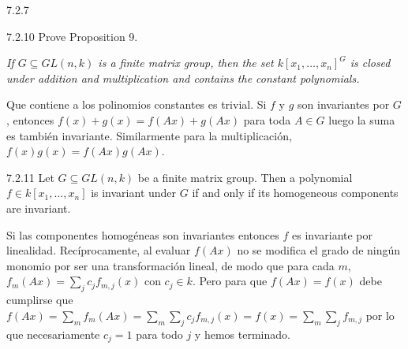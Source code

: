 \documentclass[twoside]{article}
\begin{document}
\begin{ejercicio}{7.2.7}

\end{ejercicio}
\begin{solucion}

\end{solucion}
\newpage

\begin{ejercicio}{7.2.10}
Prove Proposition 9.
\end{ejercicio}
\begin{solucion}
\emph{If $G ⊆ GL(n, k)$ is a finite matrix group, then the set $k[x_1, \dots , x_n]^G$
is closed under addition and multiplication and contains the constant polynomials.}


Que contiene a los polinomios constantes es trivial. Si $f$ y $g$ son invariantes por $G$, entonces $f(x)+g(x)=f(Ax)+g(Ax)$ para toda $A\in G$ luego la suma es también invariante. Similarmente para la multiplicación, $f(x)g(x)=f(Ax)g(Ax)$. 
\end{solucion}

\newpage

\begin{ejercicio}{7.2.11}
Let $G ⊆ GL(n, k)$ be a finite matrix group. Then a polynomial
$f ∈ k[x_1, \dots , x_n]$ is invariant under $G$ if and only if its homogeneous components
are invariant.
\end{ejercicio}
\begin{solucion}
Si las componentes homogéneas son invariantes entonces $f$ es invariante por linealidad. Recíprocamente, al evaluar $f(Ax)$ no se modifica el grado de ningún monomio por ser una transformación lineal, de modo que para cada $m$, $f_m(Ax)=\sum_j c_jf_{m,j}(x)$ con $c_j\in k$. Pero para que $f(Ax)=f(x)$ debe cumplirse que $f(Ax)=\sum_m f_m(Ax)=\sum_m\sum_j c_jf_{m,j}(x)=f(x)=\sum_m\sum_j f_{m,j}$ por lo que necesariamente $c_j=1$ para todo $j$ y hemos terminado.

\end{solucion}

\newpage
\end{document}
